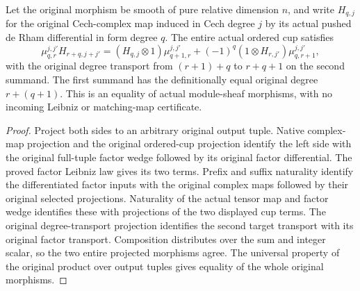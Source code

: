\begin{theorem}
\label{thm:di-cech-cup-derham-leibniz}
\leanok
{}
Let the original morphism be smooth of pure relative dimension $n$,
and write $H_{q,j}$ for the original Cech-complex map induced in
Cech degree $j$ by its actual pushed de Rham differential in form
degree $q$. The entire actual ordered cup satisfies
\[
 \mu_{q,r}^{j,j'} H_{r+q,j+j'}=
 (H_{q,j}\otimes 1)\mu_{q+1,r}^{j,j'}+
 (-1)^q(1\otimes H_{r,j'})\mu_{q,r+1}^{j,j'},
\]
with the original degree transport from $(r+1)+q$ to $r+q+1$ on
the second summand. The first summand has the definitionally equal
original degree $r+(q+1)$. This is an equality of actual module-sheaf
morphisms, with no incoming Leibniz or matching-map certificate.
\end{theorem}
\begin{proof}
\leanok
Project both sides to an arbitrary original output tuple. Native
complex-map projection and the original ordered-cup projection
identify the left side with the original full-tuple factor wedge
followed by its original factor differential. The proved factor
Leibniz law gives its two terms. Prefix and suffix naturality identify
the differentiated factor inputs with the original complex maps
followed by their original selected projections. Naturality of the
actual tensor map and factor wedge identifies these with projections
of the two displayed cup terms. The original degree-transport
projection identifies the second target transport with its original
factor transport. Composition distributes over the sum and integer
scalar, so the two entire projected morphisms agree. The universal
property of the original product over output tuples gives equality
of the whole original morphisms.
\end{proof}
